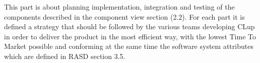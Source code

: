\documentclass[../../main.tex]{subfiles}
\begin{document}
This part is about planning implementation, integration and testing of the components described in the component view section (2.2).
For each part it is defined a strategy that should be followed by the various teams developing CLup in order to deliver the product in 
the most efficient way, with the lowest Time To Market possible and conforming at the same time the software system attributes which 
are defined in RASD section 3.5.
\end{document}
